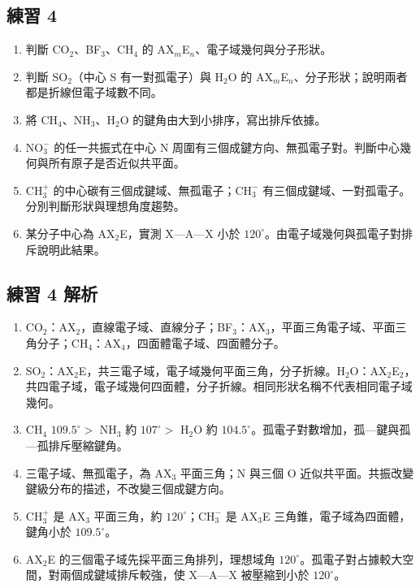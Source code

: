 \documentclass[11pt,a4paper]{article}
\providecommand{\tightlist}{%
  \setlength{\itemsep}{0pt}\setlength{\parskip}{0pt}}
\begin{document}
\subsection{練習 4}\label{ux7df4ux7fd2-4}

\begin{enumerate}
\def\labelenumi{\arabic{enumi}.}
\tightlist
\item
  判斷 CO\(_2\)、BF\(_3\)、CH\(_4\) 的 AX\(_m\)E\(_n\)、電子域幾何與分子形狀。
\item
  判斷 SO\(_2\)（中心 S 有一對孤電子）與 H\(_2\)O 的 AX\(_m\)E\(_n\)、分子形狀；說明兩者都是折線但電子域數不同。
\item
  將 CH\(_4\)、NH\(_3\)、H\(_2\)O 的鍵角由大到小排序，寫出排斥依據。
\item
  \(\mathrm{NO_3^-}\) 的任一共振式在中心 N 周圍有三個成鍵方向、無孤電子對。判斷中心幾何與所有原子是否近似共平面。
\item
  \(\mathrm{CH_3^+}\) 的中心碳有三個成鍵域、無孤電子；\(\mathrm{CH_3^-}\) 有三個成鍵域、一對孤電子。分別判斷形狀與理想角度趨勢。
\item
  某分子中心為 AX\(_2\)E，實測 X---A---X 小於 \(120^\circ\)。由電子域幾何與孤電子對排斥說明此結果。
\end{enumerate}

\subsection{練習 4 解析}\label{ux7df4ux7fd2-4-ux89e3ux6790}

\begin{enumerate}
\def\labelenumi{\arabic{enumi}.}
\tightlist
\item
  CO\(_2\)：AX\(_2\)，直線電子域、直線分子；BF\(_3\)：AX\(_3\)，平面三角電子域、平面三角分子；CH\(_4\)：AX\(_4\)，四面體電子域、四面體分子。
\item
  SO\(_2\)：AX\(_2\)E，共三電子域，電子域幾何平面三角，分子折線。H\(_2\)O：AX\(_2\)E\(_2\)，共四電子域，電子域幾何四面體，分子折線。相同形狀名稱不代表相同電子域幾何。
\item
  CH\(_4\) \(109.5^\circ>\) NH\(_3\) 約 \(107^\circ>\) H\(_2\)O 約 \(104.5^\circ\)。孤電子對數增加，孤---鍵與孤---孤排斥壓縮鍵角。
\item
  三電子域、無孤電子，為 AX\(_3\) 平面三角；N 與三個 O 近似共平面。共振改變鍵級分布的描述，不改變三個成鍵方向。
\item
  \(\mathrm{CH_3^+}\) 是 AX\(_3\) 平面三角，約 \(120^\circ\)；\(\mathrm{CH_3^-}\) 是 AX\(_3\)E 三角錐，電子域為四面體，鍵角小於 \(109.5^\circ\)。
\item
  AX\(_2\)E 的三個電子域先採平面三角排列，理想域角 \(120^\circ\)。孤電子對占據較大空間，對兩個成鍵域排斥較強，使 X---A---X 被壓縮到小於 \(120^\circ\)。
\end{enumerate}
\end{document}
